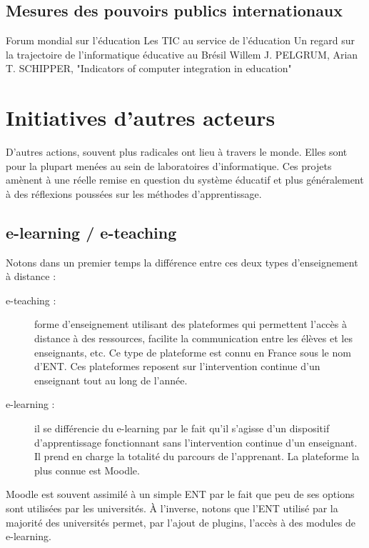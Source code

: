 \section{Mesures des pouvoirs publics internationaux}
Forum mondial sur l’éducation \cite{educ_forum}
Les TIC au service de l’éducation \cite{tics}
Un regard sur la trajectoire de l’informatique éducative au Brésil \cite{peixoto2006regard}
Willem J. PELGRUM, Arian T. SCHIPPER, "Indicators of computer integration in education" \cite{pelgrum1993indicators}


\chapter{Initiatives d'autres acteurs}
\label{chap:initialivesautres}

D'autres actions, souvent plus radicales ont lieu à travers le monde. Elles sont pour la plupart menées au sein de laboratoires d'informatique. Ces projets amènent à une réelle remise en question du système éducatif et plus généralement à des réflexions poussées sur les méthodes d'apprentissage.

\section{e-learning / e-teaching}

Notons dans un premier temps la différence entre ces deux types d'enseignement à distance :

\begin{description}
  \item[e-teaching :] forme d'enseignement utilisant des plateformes qui permettent l'accès à distance à des ressources, facilite la communication entre les élèves et les enseignants, etc. Ce type de plateforme est connu en France sous le nom d'\gls{ENT}. Ces plateformes reposent sur l’intervention continue d'un enseignant tout au long de l'année.
  \item[e-learning :] il se différencie du e-learning par le fait qu'il s'agisse d'un dispositif d'apprentissage fonctionnant sans l'intervention continue d'un enseignant. Il prend en charge la totalité du parcours de l'apprenant. La plateforme la plus connue est Moodle\cite{moodle_website}.
\end{description}

Moodle est souvent assimilé à un simple ENT par le fait que peu de ses options sont utilisées par les universités. À l'inverse, notons que l'ENT utilisé par la majorité des universités permet, par l'ajout de plugins, l'accès à des modules de e-learning.

